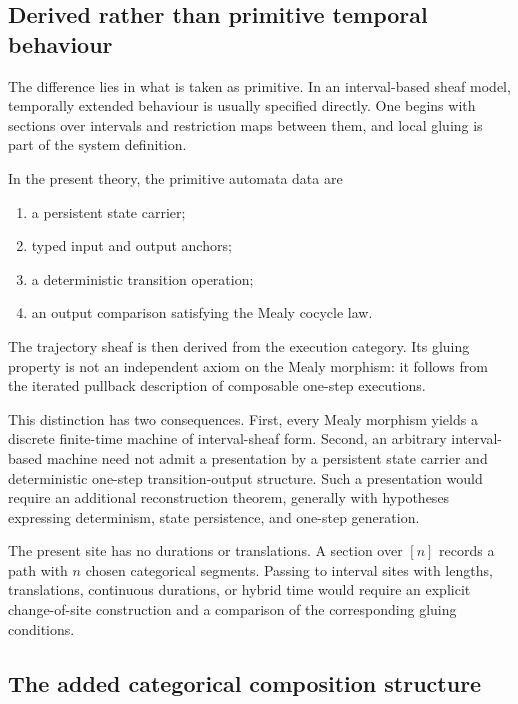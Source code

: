 \subsection{Derived rather than primitive temporal behaviour}
\label{subsec:difference-primitive-structure-temporal}

The difference lies in what is taken as primitive. In an interval-based sheaf
model, temporally extended behaviour is usually specified directly. One begins
with sections over intervals and restriction maps between them, and local
gluing is part of the system definition.

In the present theory, the primitive automata data are
\begin{enumerate}
    \item a persistent state carrier;
    \item typed input and output anchors;
    \item a deterministic transition operation;
    \item an output comparison satisfying the Mealy cocycle law.
\end{enumerate}
The trajectory sheaf is then derived from the execution category. Its gluing
property is not an independent axiom on the Mealy morphism: it follows from the
iterated pullback description of composable one-step executions.

This distinction has two consequences. First, every Mealy morphism yields a
discrete finite-time machine of interval-sheaf form. Second, an arbitrary
interval-based machine need not admit a presentation by a persistent state
carrier and deterministic one-step transition-output structure. Such a
presentation would require an additional reconstruction theorem, generally
with hypotheses expressing determinism, state persistence, and one-step
generation.

The present site has no durations or translations. A section over \([n]\)
records a path with \(n\) chosen categorical segments. Passing to interval
sites with lengths, translations, continuous durations, or hybrid time would
require an explicit change-of-site construction and a comparison of the
corresponding gluing conditions.

\subsection{The added categorical composition structure}
\label{subsec:segal-refinement-temporal}

